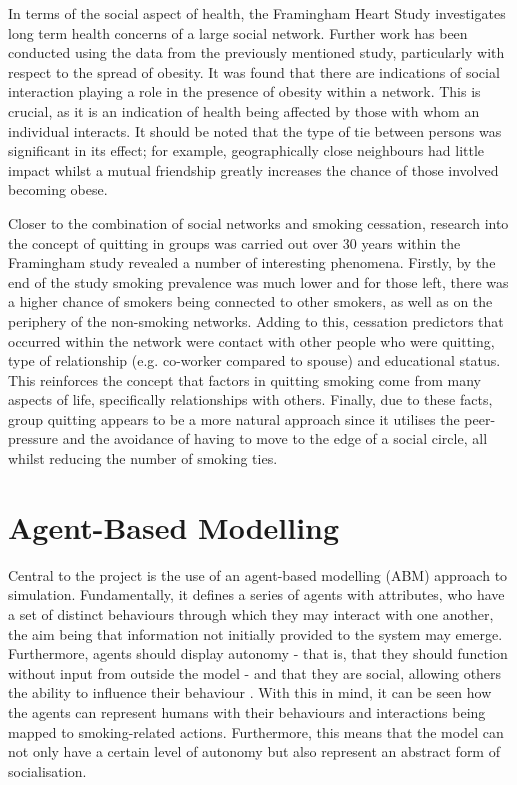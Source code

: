 \documentclass[]{report}
\begin{document}
In terms of the social aspect of health, the Framingham Heart Study investigates long term health concerns of a large social network\cite{framingham}. Further work has been conducted using the data from the previously mentioned study, particularly with respect to the spread of obesity\cite{obPap}. It was found that there are indications of social interaction playing a role in the presence of obesity within a network. This is crucial, as it is an indication of health being affected by those with whom an individual interacts. It should be noted that the type of tie between persons was significant in its effect; for example, geographically close neighbours had little impact whilst a mutual friendship greatly increases the chance of those involved becoming obese.

Closer to the combination of social networks and smoking cessation, research into the concept of quitting in groups was carried out over 30 years within the Framingham study revealed a number of interesting phenomena\cite{droves}. Firstly, by the end of the study smoking prevalence was much lower and for those left, there was a higher chance of smokers being connected to other smokers, as well as on the periphery of the non-smoking networks. Adding to this, cessation predictors that occurred within the network were contact with other people who were quitting, type of relationship (e.g. co-worker compared to spouse) and educational status. This reinforces the concept that factors in quitting smoking come from many aspects of life, specifically relationships with others. Finally, due to these facts, group quitting appears to be a more natural approach since it utilises the peer-pressure and the avoidance of having to move to the edge of a social circle, all whilst reducing the number of smoking ties.

\section{Agent-Based Modelling}
Central to the project is the use of an agent-based modelling (ABM) approach to simulation. Fundamentally, it defines a series of agents with attributes, who have a set of distinct behaviours through which they may interact with one another, the aim being that information not initially provided to the system may emerge. Furthermore, agents should display autonomy - that is, that they should function without input from outside the model - and that they are social, allowing others the ability to influence their behaviour \cite{repast-tut}. With this in mind, it can be seen how the agents can represent humans with their behaviours and interactions being mapped to smoking-related actions. Furthermore, this means that the model can not only have a certain level of autonomy but also represent an abstract form of socialisation.
\end{document}
